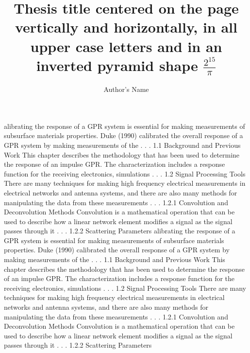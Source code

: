 \documentclass[12pt,oneside,showtrims]{mines-thesis}
\title{Thesis title centered on the page vertically and horizontally, in all upper case letters and in an inverted pyramid shape $\frac{2^{15}}{\pi}$}         %
\author{Author's Name}  %
\begin{document}
	\maketitlepage
	\makecopyrightpage
alibrating the response of a GPR system is essential for making measurements of subsurface materials properties. Duke (1990) calibrated the overall response of a GPR system by making measurements of the . . .
1.1 Background and Previous Work
This chapter describes the methodology that has been used to determine the response of an impulse GPR. The characterization includes a response function for the receiving electronics, simulations . . .
1.2 Signal Processing Tools
There are many techniques for making high frequency electrical measurements in electrical networks and antenna systems, and there are also many methods for manipulating the data from these measurements . . .
1.2.1 Convolution and Deconvolution Methods
Convolution is a mathematical operation that can be used to describe how a linear network element modifies a signal as the signal passes through it . . .
1.2.2 Scattering Parameters
\newpage
alibrating the response of a GPR system is essential for making measurements of subsurface materials properties. Duke (1990) calibrated the overall response of a GPR system by making measurements of the . . .
1.1 Background and Previous Work
This chapter describes the methodology that has been used to determine the response of an impulse GPR. The characterization includes a response function for the receiving electronics, simulations . . .
1.2 Signal Processing Tools
There are many techniques for making high frequency electrical measurements in electrical networks and antenna systems, and there are also many methods for manipulating the data from these measurements . . .
1.2.1 Convolution and Deconvolution Methods
Convolution is a mathematical operation that can be used to describe how a linear network element modifies a signal as the signal passes through it . . .
1.2.2 Scattering Parameters
\end{document}
